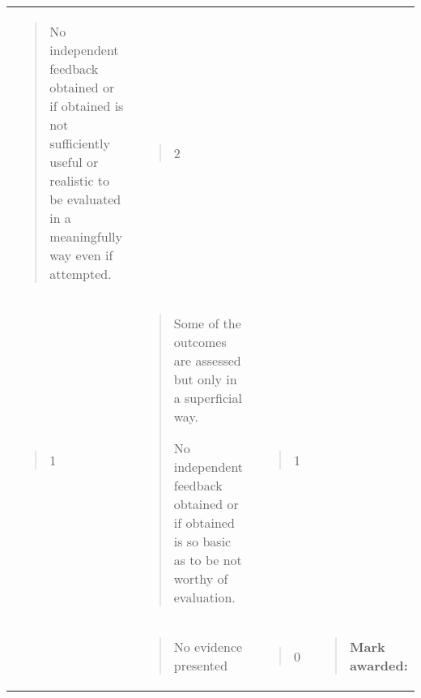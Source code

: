 \documentclass[
]{article}
\begin{document}
\begin{longtable}[]{@{}llll@{}}
\begin{minipage}[t]{0.22\columnwidth}
\begin{quote}
No independent feedback obtained or if obtained is not sufficiently
useful or realistic to be evaluated in a meaningfully way even if
attempted.
\end{quote}\strut
\end{minipage} & \begin{minipage}[t]{0.22\columnwidth}\raggedright
\begin{quote}
2
\end{quote}\strut
\end{minipage} & \begin{minipage}[t]{0.22\columnwidth}\raggedright
\strut
\end{minipage}\tabularnewline
\begin{minipage}[t]{0.22\columnwidth}\raggedright
\begin{quote}
1
\end{quote}\strut
\end{minipage} & \begin{minipage}[t]{0.22\columnwidth}\raggedright
\begin{quote}
Some of the outcomes are assessed but only in a superficial way.

No independent feedback obtained or if obtained is so basic as to be not
worthy of evaluation.
\end{quote}\strut
\end{minipage} & \begin{minipage}[t]{0.22\columnwidth}\raggedright
\begin{quote}
1
\end{quote}\strut
\end{minipage} & \begin{minipage}[t]{0.22\columnwidth}\raggedright
\strut
\end{minipage}\tabularnewline
\begin{minipage}[t]{0.22\columnwidth}\raggedright
\strut
\end{minipage} & \begin{minipage}[t]{0.22\columnwidth}\raggedright
\begin{quote}
No evidence presented
\end{quote}\strut
\end{minipage} & \begin{minipage}[t]{0.22\columnwidth}\raggedright
\begin{quote}
0
\end{quote}\strut
\end{minipage} & \begin{minipage}[t]{0.22\columnwidth}\raggedright
\begin{quote}
\textbf{Mark awarded:}
\end{quote}\strut
\end{minipage}\tabularnewline
\bottomrule
\end{longtable}
\end{document}
